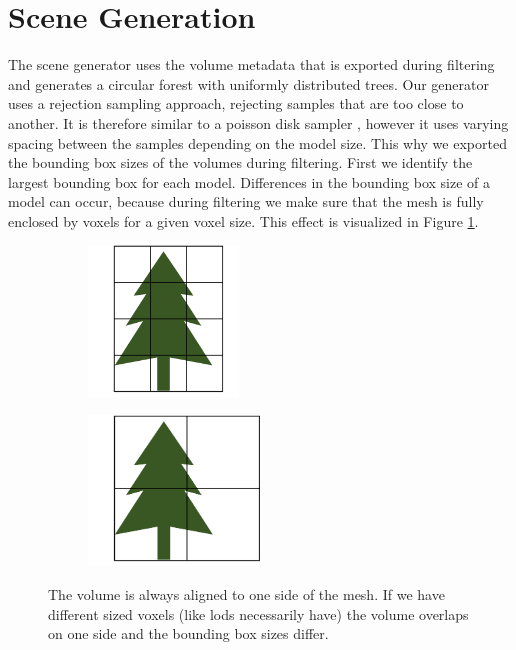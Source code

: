 \section{Scene Generation}
\label{sec:scene_generation}
The scene generator uses the volume metadata that is exported during filtering and generates a circular forest with uniformly distributed trees.
Our generator uses a rejection sampling approach, rejecting samples that are too close to another.
It is therefore similar to a poisson disk sampler \cite{poisson_sampling}, however it uses varying spacing between the samples depending on the model size.
This why we exported the bounding box sizes of the volumes during filtering.
First we identify the largest bounding box for each model.
Differences in the bounding box size of a model can occur, because during filtering we make sure that the mesh is fully enclosed by voxels for a given voxel size.
This effect is visualized in Figure \ref{fig:bounding_sizes}.
\begin{figure}[ht]
    \centering
    \begin{subfigure}[b]{0.45\linewidth}
        \centering
        \includegraphics[height=4cm]{img/bounding_size_1.png}
    \end{subfigure}
    \begin{subfigure}[b]{0.45\linewidth}
        \centering
        \includegraphics[height=4cm]{img/bounding_size_2.png}
    \end{subfigure}
	\caption[Bounding boxes resulting from different sized voxels]{The volume is always aligned to one side of the mesh. If we have different sized voxels (like \acsp{lod} necessarily have) the volume overlaps on one side and the bounding box sizes differ.}
	\label{fig:bounding_sizes}
\end{figure}
